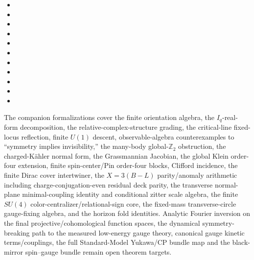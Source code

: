 \documentclass[11pt]{article}
\theoremstyle{definition}\newtheorem{definition}[theorem]{Definition}
\theoremstyle{remark}\newtheorem{remark}[theorem]{Remark}\newtheorem{conjecture}[theorem]{Conjecture}
\begin{document}
\begin{itemize}[leftmargin=2em]
\item {}
\item {}
\item {}
\item {}
\item {}
\item {}
\item {}
\item {}
\item {}
\item {}
\item {}
\end{itemize}
The companion formalizations cover the finite orientation algebra, the $I_q$-real-form decomposition, the relative-complex-structure grading, the critical-line fixed-locus reflection, finite $U(1)$ descent, observable-algebra counterexamples to ``symmetry implies invisibility,'' the many-body global-$\mathbb Z_2$ obstruction, the charged-K\"ahler normal form, the Grassmannian Jacobian, the global Klein order-four extension, finite spin-center/Pin order-four blocks, Clifford incidence, the finite Dirac cover intertwiner, the $X=3(B-L)$ parity/anomaly arithmetic including charge-conjugation-even residual deck parity, the transverse normal-plane minimal-coupling identity and conditional zitter scale algebra, the finite $SU(4)$ color-centralizer/relational-sign core, the fixed-mass transverse-circle gauge-fixing algebra, and the horizon fold identities. Analytic Fourier inversion on the final projective/cohomological function spaces, the dynamical symmetry-breaking path to the measured low-energy gauge theory, canonical gauge kinetic terms/couplings, the full Standard-Model Yukawa/CP bundle map and the black-mirror spin--gauge bundle remain open theorem targets.
\end{document}
